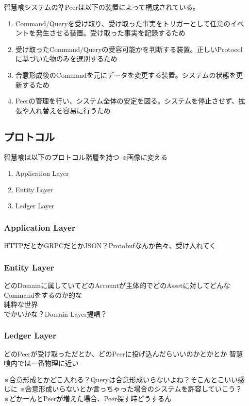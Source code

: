 \documentclass[10pt,a4paper]{jarticle}
\begin{document}
\begin{multicols}{2}
智慧喰システムの準Peerは以下の装置によって構成されている。
\begin{enumerate}
  \item Command/Queryを受け取り、受け取った事実をトリガーとして任意のイベントを発生させる装置。受け取った事実を記録するため
  \item 受け取ったCommand/Queryの受容可能かを判断する装置。正しいProtocolに基づいた物のみを選別するため
  \item 合意形成後のCommandを元にデータを変更する装置。システムの状態を更新するため
  \item Peerの管理を行い、システム全体の安定を図る。システムを停止させず、拡張や入れ替えを容易に行うため  
\end{enumerate}

\subsection{プロトコル}
智慧喰は以下のプロトコル階層を持つ
※画像に変える
\begin{enumerate}
  \item Application Layer
  \item Entity Layer
  \item Ledger Layer
\end{enumerate}

\subsubsection{Application Layer}
HTTPだとかGRPCだとかJSON？Protobufなんか色々、受け入れてく

\subsubsection{Entity Layer}
どのDomainに属していてどのAccountが主体的でどのAssetに対してどんなCommandをするのか的な\\
純粋な世界\\
でかいかな？Domain Layer提唱？

\subsubsection{Ledger Layer}
どのPeerが受け取っただとか、どのPeerに投げ込んだらいいのかとかとか
智慧喰内では一番物理に近い

※合意形成とかどこ入れる？Queryは合意形成いらないよね？そこんとこいい感じに
※合意形成いらないとか言っちゃった場合のシステムを許容していこう？
※どかーんとPeerが増えた場合、Peer探す時どうするん


\end{multicols}
\end{document}
